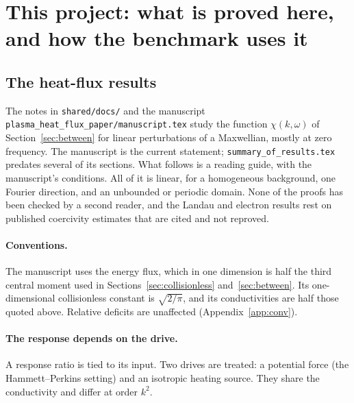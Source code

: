 \section{This project: what is proved here, and how the benchmark uses it}
\label{sec:repo}

\subsection{The heat-flux results}

The notes in \texttt{shared/docs/} and the manuscript
\texttt{plasma\_heat\_flux\_paper/manuscript.tex} study the function
$\chi(k,\omega)$ of Section~\ref{sec:between} for linear perturbations of a
Maxwellian, mostly at zero frequency. The manuscript is the current
statement; \texttt{summary\_of\_results.tex} predates several of its
sections. What follows is a reading guide, with the manuscript's
conditions. All of it is linear, for a homogeneous background, one Fourier
direction, and an unbounded or periodic domain. None of the proofs has been
checked by a second reader, and the Landau and electron results rest on
published coercivity estimates that are cited and not reproved.

\paragraph{Conventions.} The manuscript uses the energy flux, which in one
dimension is half the third central moment used in
Sections~\ref{sec:collisionless} and~\ref{sec:between}. Its
one-dimensional collisionless constant is $\sqrt{2/\pi}$, and its
conductivities are half those quoted above. Relative deficits are
unaffected (Appendix~\ref{app:conv}).

\paragraph{The response depends on the drive.} A response ratio is tied to
its input. Two drives are treated: a potential force (the Hammett--Perkins
setting) and an isotropic heating source. They share the conductivity and
differ at order $k^2$.

